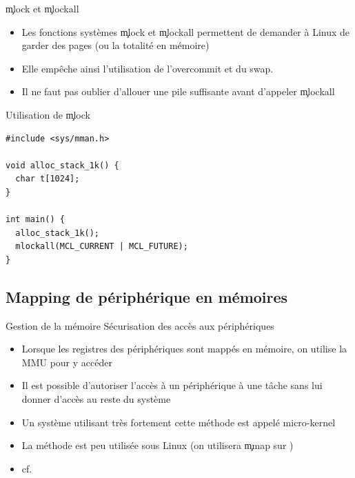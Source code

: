 \begin{frame}[fragile=singleslide]{\c{mlock} et \c{mlockall}}
  \begin{itemize}
  \item Les fonctions systèmes \c{mlock} et \c{mlockall} permettent de
    demander à Linux de garder des pages (ou la totalité en mémoire)
  \item Elle empêche ainsi l'utilisation de l'overcommit et du swap.
  \item Il  ne faut  pas oublier d'allouer  une pile  suffisante avant
    d'appeler \c{mlockall} 
  \end{itemize}
\end{frame}

\begin{frame}[fragile]{Utilisation de \c{mlock}}
\begin{lstlisting}
#include <sys/mman.h>

void alloc_stack_1k() {
  char t[1024];
}

int main() {
  alloc_stack_1k();
  mlockall(MCL_CURRENT | MCL_FUTURE);
}
\end{lstlisting}
\end{frame}

\subsection{Mapping de périphérique en mémoires}

\begin{frame}{Gestion de la mémoire}
  Sécurisation des accès aux périphériques
  \begin{itemize}
  \item  Lorsque  les  registres  des  périphériques  sont  mappés  en
    mémoire, on utilise la MMU pour y accéder
  \item Il  est possible d'autoriser  l'accès à un périphérique  à une
    tâche sans lui donner d'accès au reste du système
  \item Un  système utilisant très fortement cette  méthode est appelé
    micro-kernel
  \item La méthode est peu  utilisée sous Linux (on utilisera \c{mmap}
    sur )
  \item cf. 
  \end{itemize}
\end{frame}

